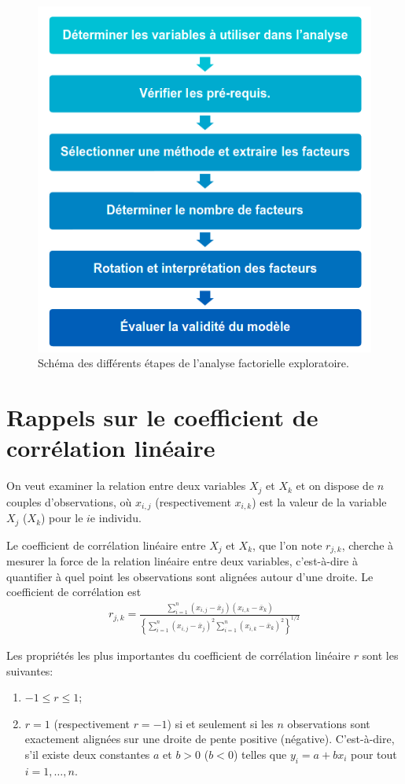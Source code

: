 \documentclass[
  11pt,
  letterpaper,
]{book}
\providecommand{\tightlist}{%
  \setlength{\itemsep}{0pt}\setlength{\parskip}{0pt}}
\theoremstyle{definition}
\theoremstyle{definition}
\theoremstyle{definition}
\theoremstyle{remark}
\begin{document}
\begin{figure}

{\centering \includegraphics[width=0.5\linewidth]{figures/01-facto-e17} 

}

\caption{Schéma des différents étapes de l'analyse factorielle exploratoire.}\label{fig:fig1p17}
\end{figure}

\hypertarget{rappels-sur-le-coefficient-de-corruxe9lation-linuxe9aire}{%
\section{Rappels sur le coefficient de corrélation linéaire}\label{rappels-sur-le-coefficient-de-corruxe9lation-linuxe9aire}}

On veut examiner la relation entre deux variables \(X_j\) et \(X_k\) et on dispose de \(n\) couples d'observations, où \(x_{i, j}\) (respectivement \(x_{i, k}\)) est la valeur de la variable \(X_j\) (\(X_k\)) pour le \(i\)e individu.

Le coefficient de corrélation linéaire entre \(X_j\) et \(X_k\), que l'on note \(r_{j, k}\), cherche à mesurer la force de la relation linéaire entre deux variables, c'est-à-dire à quantifier à quel point les observations sont alignées autour d'une droite. Le coefficient de corrélation est
\begin{align*}
r_{j, k} = \frac{\sum_{i=1}^n (x_{i, j}-\overline{x}_j)(x_{i, k} -\overline{x}_{k})}{\left\{\sum_{i=1}^n (x_{i, j}-\overline{x}_j)^2 \sum_{i=1}^n(x_{i, k} -\overline{x}_{k})^2\right\}^{1/2}}
\end{align*}

Les propriétés les plus importantes du coefficient de corrélation linéaire \(r\) sont les suivantes:

\begin{enumerate}
\def\labelenumi{\arabic{enumi})}
\tightlist
\item
  \(-1 \leq r \leq 1\);
\item
  \(r=1\) (respectivement \(r=-1\)) si et seulement si les \(n\) observations sont exactement alignées sur une droite de pente positive (négative). C'est-à-dire, s'il existe deux constantes \(a\) et \(b>0\) (\(b<0\)) telles que \(y_i=a+b x_i\) pour tout \(i=1, \ldots, n\).
\end{enumerate}
\end{document}

